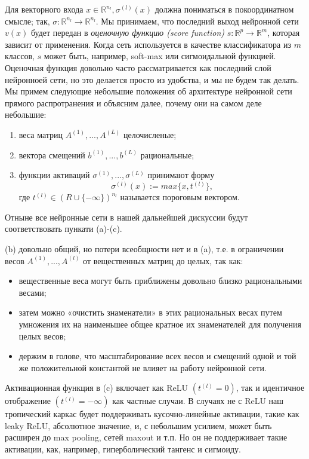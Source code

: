 \documentclass[russian]{lecture-notes}
\begin{document}
	Для векторного входа $x \in \mathbb{R}^{n_l}, \sigma^{(l)}(x)$ должна пониматься в покоординатном смысле; так, $\sigma : \mathbb{R}^{n_l} \to \mathbb{R}^{n_l}$. Мы принимаем, что последний выход нейронной сети $v(x)$ будет передан в \textit{оценочную функцию (score function)} $s : \mathbb{R}^p \to \mathbb{R}^m$, которая зависит от применения. Когда сеть используется в качестве классификатора из $m$ классов, $s$ может быть, например, soft-max или сигмоидальной функцией. Оценочная функция довольно часто рассматривается как последний слой нейронноей сети, но это делается просто из удобства, и мы не будем так делать. Мы примем следующие небольшие положения об архитектуре нейронной сети прямого распротранения и объясним далее, почему они на самом деле небольшие:
	
	\begin{enumerate}
		\item веса матриц $A^{(1)},...,A^{(L)}$ целочисленые;
		\item вектора смещений $b^{(1)},...,b^{(L)}$ рациональные;
		\item функции активаций $\sigma^{(1)},...,\sigma^{(L)}$ принимают форму 
		\begin{equation*}
		\sigma^{(l)}(x) := max\{x,t^{(l)}\},
		\end{equation*}
		где $t^{(l)} \in (R \cup \{- \infty \})^{n_l}$ называется пороговым вектором.
	\end{enumerate}
	
	Отныне все нейронные сети в нашей дальнейшей дискуссии будут соответствовать пункати (a)-(c).
	
	(b) довольно общий, но потери всеобщности нет и в (a), т.е. в ограничении весов $A^{(1)},...,A^{(l)}$ от вещественных матриц до целых, так как:
	\begin{itemize}
		\item вещественные веса могут быть приближены довольно близко рациональными весами;
		\item затем можно «очистить знаменатели» в этих рациональных весах путем умножения их на наименьшее общее кратное их знаменателей для получения целых весов;
		\item держим в голове, что масштабирование всех весов и смещений одной и той же положительной константой не влияет на работу нейронной сети. 
	\end{itemize}
	
	Активационная функция в (c) включает как ReLU $(t^{(l)} = 0)$, так и идентичное отображение $(t^{(l)} = - \infty)$ как частные случаи. В случаях не с ReLU наш тропический каркас будет поддерживать кусочно-линейные активации, такие как leaky ReLU, абсолютное значение, и, с небольшим усилием, может быть расширен до max pooling, сетей maxout и т.п. Но он не поддерживает такие активации, как, например, гиперболический тангенс и сигмоиду.
	
\end{document}
